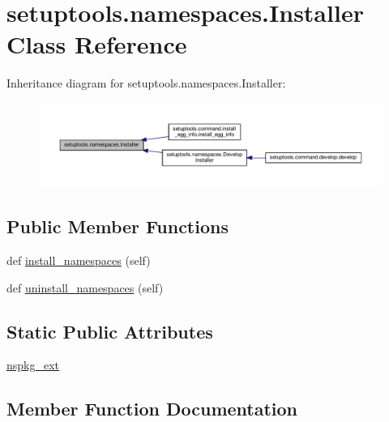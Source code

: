 \hypertarget{classsetuptools_1_1namespaces_1_1Installer}{}\section{setuptools.\+namespaces.\+Installer Class Reference}
\label{classsetuptools_1_1namespaces_1_1Installer}


Inheritance diagram for setuptools.\+namespaces.\+Installer\+:
\nopagebreak
\begin{figure}[H]
\begin{center}
\leavevmode
\includegraphics[width=350pt]{classsetuptools_1_1namespaces_1_1Installer__inherit__graph}
\end{center}
\end{figure}
\subsection*{Public Member Functions}
\begin{DoxyCompactItemize}
\item 
def \hyperlink{classsetuptools_1_1namespaces_1_1Installer_a0fe74a62f56e2023a5b3763829e1f238}{install\+\_\+namespaces} (self)
\item 
def \hyperlink{classsetuptools_1_1namespaces_1_1Installer_a82bca6421a59db161d2f78b6ba075092}{uninstall\+\_\+namespaces} (self)
\end{DoxyCompactItemize}
\subsection*{Static Public Attributes}
\begin{DoxyCompactItemize}
\item 
\hyperlink{classsetuptools_1_1namespaces_1_1Installer_a819c039a70ac64b39985e5cf6561fd97}{nspkg\+\_\+ext}
\end{DoxyCompactItemize}


\subsection{Member Function Documentation}
\mbox{\label{classsetuptools_1_1namespaces_1_1Installer_a0fe74a62f56e2023a5b3763829e1f238}} 
